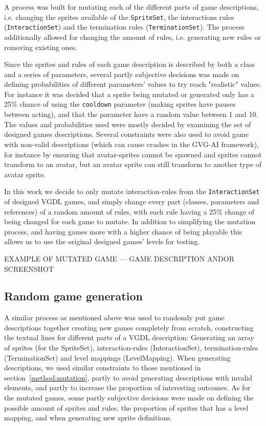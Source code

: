 \documentclass[a4paper,titlepage,final]{report}
\begin{document}
A process was built for mutating each of the different parts of game descriptions, i.e. changing the sprites available of the \texttt{SpriteSet}, the interactions rules (\texttt{InteractionSet}) and the termination rules (\texttt{TerminationSet}).
The process additionally allowed for changing the amount of rules, i.e. generating new rules or removing existing ones.

Since the sprites and rules of each game description is described by both a class and a series of parameters, several partly subjective decisions was made on defining probabilities of different parameters' values to try reach "realistic" values.
For instance it was decided that a sprite being mutated or generated only has a 25\% chance of using the \texttt{cooldown} parameter (making sprites have pauses between acting), and that the parameter have a random value between 1 and 10.
The values and probabilities used were mostly decided by examining the set of designed games descriptions.
Several constraints were also used to avoid game with non-valid descriptions (which can cause crashes in the GVG-AI framework), for instance by ensuring that avatar-sprites cannot be spawned and sprites cannot transform to an avatar, but an avatar sprite can still transform to another type of avatar sprite.

In this work we decide to only mutate interaction-rules from the \texttt{InteractionSet} of designed VGDL games, and simply change every part (classes, parameters and references) of a random amount of rules, with each rule having a 25\% change of being changed for each game to mutate.
In addition to simplifying the mutation process, and having games more with a higher chance of being playable this allows us to use the original designed games' levels for testing.



EXAMPLE OF MUTATED GAME --- GAME DESCRIPTION ANDOR SCREENSHOT


\subsection{Random game generation}
\label{method:random}
A similar process as mentioned above was used to randomly put game descriptions together creating new games completely from scratch, constructing the textual lines for different parts of a VGDL description: Generating an array of sprites (for the SpriteSet), interaction-rules (InteractionSet), termination-rules (TerminationSet) and level mappings (LevelMapping). 
When generating descriptions, we used similar constraints to those mentioned in section~\ref{method:mutation}, partly to avoid generating descriptions with invalid elements, and partly to increase the proportion of interesting outcomes. 
As for the mutated games, some partly subjective decisions were made on defining the possible amount of sprites and rules, the proportion of sprites that has a level mapping, and when generating new sprite definitions.
\end{document}
